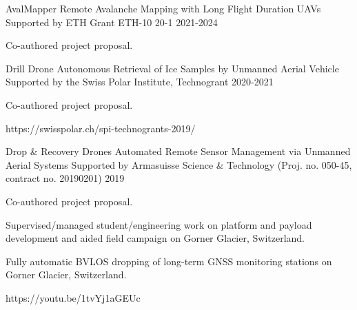\label{sec:proj}
\begin{cventries}

  \cvprojwideentry
  	{AvalMapper} %
  	{Remote Avalanche Mapping with Long Flight Duration UAVs} %
    {Supported by ETH Grant ETH-10 20-1} %
    {2021-2024} %
    {
      \begin{cvitems} %
        \item {Co-authored project proposal.}
      \end{cvitems}
    } %
    {} %
    {\showprojectdescriptions}

  \cvprojwideentry
  	{Drill Drone} %
  	{Autonomous Retrieval of Ice Samples by Unmanned Aerial Vehicle} %
    {Supported by the Swiss Polar Institute, Technogrant} %
    {2020-2021} %
    {
      \begin{cvitems} %
        \item {Co-authored project proposal.}
      \end{cvitems}
    } %
    {https://swisspolar.ch/spi-technogrants-2019/} %
    {\showprojectdescriptions}
    
  \cvprojwideentry
  	{Drop \& Recovery Drones} %
  	{Automated Remote Sensor Management via Unmanned Aerial Systems} %
    {Supported by Armasuisse Science \& Technology (Proj. no. 050-45, contract no. 20190201)} %
    {2019} %
    {
      \begin{cvitems} %
        \item {Co-authored project proposal.}
        \item {Supervised/managed student/engineering work on platform and payload development and aided field campaign on Gorner Glacier, Switzerland.}
        \item {Fully automatic BVLOS dropping of long-term GNSS monitoring stations on Gorner Glacier, Switzerland.}
      \end{cvitems}
    } %
    {https://youtu.be/1tvYj1aGEUc} %
    {\showprojectdescriptions}


\end{cventries}
